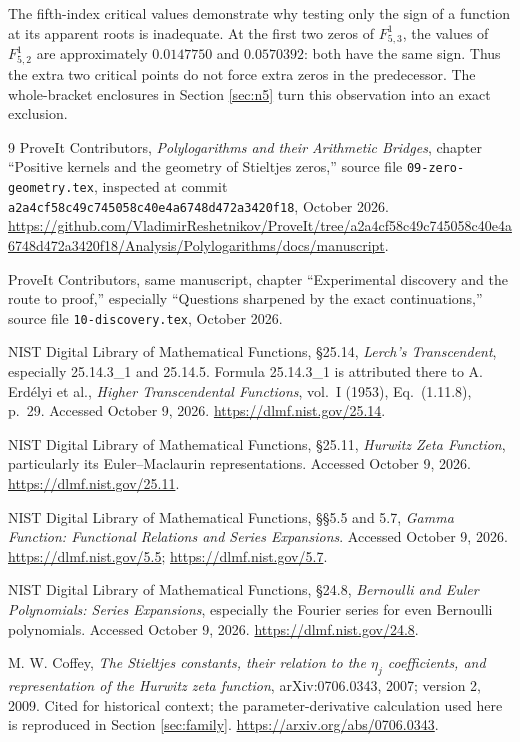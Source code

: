 \documentclass[11pt]{article}
\numberwithin{equation}{section}
\theoremstyle{definition}\newtheorem{definition}[theorem]{Definition}
\theoremstyle{remark}\newtheorem{remark}[theorem]{Remark}
\newcommand{\sha}{\texttt{a2a4cf58c49c745058c40e4a6748d472a3420f18}}
\begin{document}
The fifth-index critical values demonstrate why testing only the sign of a function at its apparent roots is inadequate. At the first two zeros of $F_{5,3}^{1}$, the values of $F_{5,2}^{1}$ are approximately $0.0147750$ and $0.0570392$: both have the same sign. Thus the extra two critical points do not force extra zeros in the predecessor. The whole-bracket enclosures in Section \ref{sec:n5} turn this observation into an exact exclusion.

\begingroup\small
\begin{thebibliography}{9}
\setlength{\itemsep}{3pt}
ProveIt Contributors, \emph{Polylogarithms and their Arithmetic Bridges}, chapter ``Positive kernels and the geometry of Stieltjes zeros,'' source file \texttt{09-zero-geometry.tex}, inspected at commit \sha, October 2026.\newline
\url{https://github.com/VladimirReshetnikov/ProveIt/tree/a2a4cf58c49c745058c40e4a6748d472a3420f18/Analysis/Polylogarithms/docs/manuscript}.

ProveIt Contributors, same manuscript, chapter ``Experimental discovery and the route to proof,'' especially ``Questions sharpened by the exact continuations,'' source file \texttt{10-discovery.tex}, October 2026.

NIST Digital Library of Mathematical Functions, \S25.14, \emph{Lerch's Transcendent}, especially 25.14.3\_1 and 25.14.5. Formula 25.14.3\_1 is attributed there to A. Erd\'elyi et al., \emph{Higher Transcendental Functions}, vol.~I (1953), Eq.~(1.11.8), p.~29. Accessed October 9, 2026.\newline
\url{https://dlmf.nist.gov/25.14}.

NIST Digital Library of Mathematical Functions, \S25.11, \emph{Hurwitz Zeta Function}, particularly its Euler--Maclaurin representations. Accessed October 9, 2026.\newline
\url{https://dlmf.nist.gov/25.11}.

NIST Digital Library of Mathematical Functions, \S\S5.5 and 5.7, \emph{Gamma Function: Functional Relations and Series Expansions}. Accessed October 9, 2026.\newline
\url{https://dlmf.nist.gov/5.5}; \url{https://dlmf.nist.gov/5.7}.

NIST Digital Library of Mathematical Functions, \S24.8, \emph{Bernoulli and Euler Polynomials: Series Expansions}, especially the Fourier series for even Bernoulli polynomials. Accessed October 9, 2026.\newline
\url{https://dlmf.nist.gov/24.8}.

M. W. Coffey, \emph{The Stieltjes constants, their relation to the $\eta_j$ coefficients, and representation of the Hurwitz zeta function}, arXiv:0706.0343, 2007; version 2, 2009. Cited for historical context; the parameter-derivative calculation used here is reproduced in Section \ref{sec:family}.\newline
\url{https://arxiv.org/abs/0706.0343}.
\end{thebibliography}
\endgroup
\end{document}
